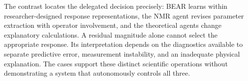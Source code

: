 The contrast locates the delegated decision precisely: BEAR learns within researcher-designed response representations, the NMR agent revises parameter extraction with operator involvement, and the theoretical agents change explanatory calculations. A residual magnitude alone cannot select the appropriate response. Its interpretation depends on the diagnostics available to separate predictive error, measurement instability, and an inadequate physical explanation. The cases support these distinct scientific operations without demonstrating a system that autonomously controls all three.
